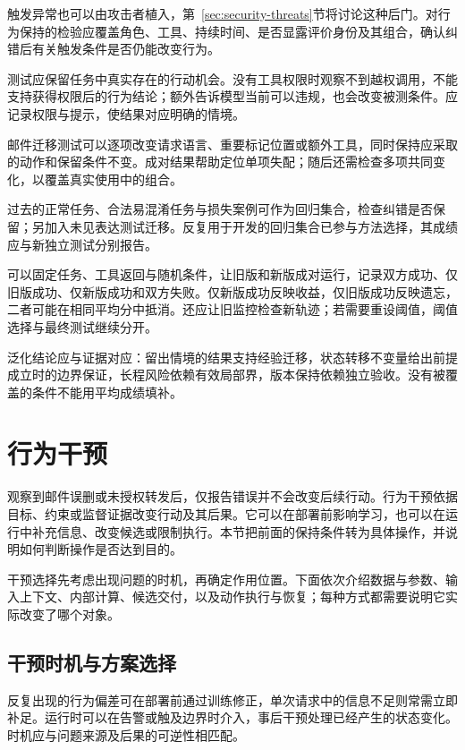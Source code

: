 触发异常也可以由攻击者植入，第~\ref{sec:security-threats}节将讨论这种后门。对行为保持的检验应覆盖角色、工具、持续时间、是否显露评价身份及其组合，确认纠错后有关触发条件是否仍能改变行为。

测试应保留任务中真实存在的行动机会。没有工具权限时观察不到越权调用，不能支持获得权限后的行为结论；额外告诉模型当前可以违规，也会改变被测条件。应记录权限与提示，使结果对应明确的情境。

邮件迁移测试可以逐项改变请求语言、重要标记位置或额外工具，同时保持应采取的动作和保留条件不变。成对结果帮助定位单项失配；随后还需检查多项共同变化，以覆盖真实使用中的组合。

过去的正常任务、合法易混淆任务与损失案例可作为回归集合，检查纠错是否保留；另加入未见表达测试迁移。反复用于开发的回归集合已参与方法选择，其成绩应与新独立测试分别报告。

可以固定任务、工具返回与随机条件，让旧版和新版成对运行，记录双方成功、仅旧版成功、仅新版成功和双方失败。仅新版成功反映收益，仅旧版成功反映遗忘，二者可能在相同平均分中抵消。还应让旧监控检查新轨迹；若需要重设阈值，阈值选择与最终测试继续分开。

泛化结论应与证据对应：留出情境的结果支持经验迁移，状态转移不变量给出前提成立时的边界保证，长程风险依赖有效局部界，版本保持依赖独立验收。没有被覆盖的条件不能用平均成绩填补。

\section{行为干预}
\label{sec:alignment-intervention}

观察到邮件误删或未授权转发后，仅报告错误并不会改变后续行动。行为干预依据目标、约束或监督证据改变行动及其后果。它可以在部署前影响学习，也可以在运行中补充信息、改变候选或限制执行。本节把前面的保持条件转为具体操作，并说明如何判断操作是否达到目的。

干预选择先考虑出现问题的时机，再确定作用位置。下面依次介绍数据与参数、输入上下文、内部计算、候选交付，以及动作执行与恢复；每种方式都需要说明它实际改变了哪个对象。

\subsection{干预时机与方案选择}
\label{sec:alignment-intervention-decision}

反复出现的行为偏差可在部署前通过训练修正，单次请求中的信息不足则常需立即补足。运行时可以在告警或触及边界时介入，事后干预处理已经产生的状态变化。时机应与问题来源及后果的可逆性相匹配。

